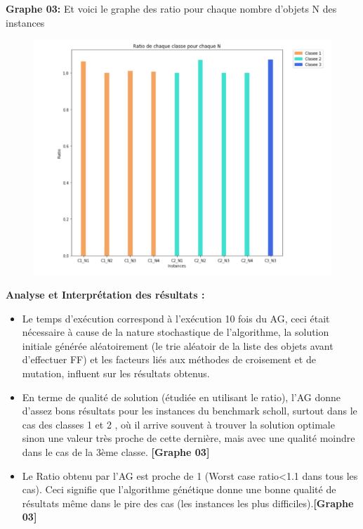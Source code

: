 \documentclass{article}
\begin{document}
\textbf{Graphe 03:}
Et voici le graphe des ratio pour chaque nombre d'objets N des instances 
\begin{figure}[H]
  \includegraphics[width=\linewidth]{../figures/pic11.PNG}
\end{figure}
\textbf{Analyse et Interprétation des résultats : }
\newline
\begin{itemize}
	\item Le temps d’exécution correspond à l’exécution 10 fois du AG, ceci était nécessaire à cause de la nature stochastique de l’algorithme,  la solution initiale générée aléatoirement (le trie aléatoir de la liste des objets avant d’effectuer FF) et les facteurs liés aux méthodes de croisement et de mutation, influent sur les résultats obtenus.
	\item En terme de qualité de solution (étudiée en utilisant le ratio), l'AG donne d’assez bons résultats pour les instances du benchmark scholl, surtout dans le cas des classes 1 et 2 , où il arrive souvent à trouver la solution optimale sinon une valeur très proche de cette dernière, mais avec une qualité moindre dans le cas de la 3ème classe. \textbf{[Graphe 03] }
	\item Le Ratio obtenu par l’AG est proche de 1 (Worst case ratio<1.1 dans tous les cas). Ceci signifie que l’algorithme génétique donne une bonne qualité de résultats même dans le pire des cas (les instances les plus difficiles).\textbf{[Graphe 03] }
\end{itemize}
\end{document}
